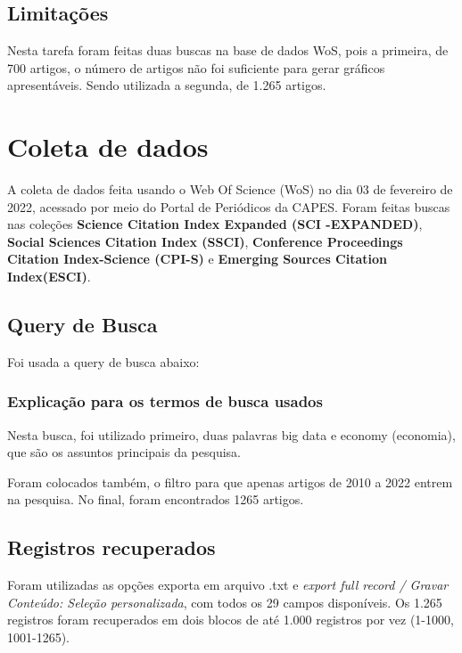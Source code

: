 \subsection{Limitações} 

Nesta tarefa foram feitas duas buscas na base de dados WoS, pois a primeira, de 700 artigos, o número de artigos não foi suficiente para gerar gráficos apresentáveis. Sendo utilizada a segunda, de 1.265 artigos.


\section{Coleta de dados}

A coleta de dados feita usando o Web Of Science (WoS) no dia 03 de fevereiro de 2022, acessado por meio do Portal de Periódicos da CAPES. Foram feitas buscas nas coleções \textbf{Science  Citation  Index  Expanded (SCI -EXPANDED)}, \textbf{Social Sciences  Citation  Index (SSCI)}, \textbf{Conference Proceedings Citation Index-Science (CPI-S)} e \textbf{Emerging Sources Citation Index(ESCI)}. 

\subsection{Query de Busca}

Foi usada a query de busca abaixo: 






\subsubsection{Explicação para os termos de busca usados}

Nesta busca, foi utilizado primeiro, duas palavras big data e economy (economia), que são os assuntos principais da pesquisa.%

Foram colocados também, o filtro para que apenas artigos de 2010 a 2022 entrem na pesquisa. No final, foram encontrados 1265 artigos.


\subsection{Registros recuperados}


Foram utilizadas as opções exporta em arquivo .txt e \textit{export full record / Gravar Conteúdo: Seleção personalizada}, com todos os 29 campos disponíveis. Os 1.265 registros foram recuperados em dois blocos de até 1.000 registros por vez (1-1000, 1001-1265).


